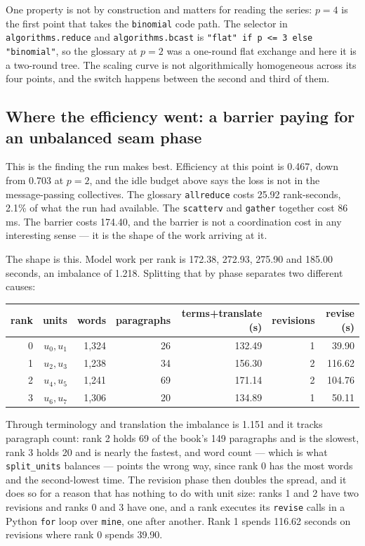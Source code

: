 \documentclass[11pt]{article}
\begin{document}
One property is not by construction and matters for reading the series: $p=4$ is the first point
that takes the \texttt{binomial} code path. The selector in \texttt{algorithms.reduce} and
\texttt{algorithms.bcast} is \texttt{"flat" if p <= 3 else "binomial"}, so the glossary at $p=2$
was a one-round flat exchange and here it is a two-round tree. The scaling curve is not
algorithmically homogeneous across its four points, and the switch happens between the second and
third of them.

\subsection*{Where the efficiency went: a barrier paying for an unbalanced seam phase}

This is the finding the run makes best. Efficiency at this point is 0.467, down from 0.703 at
$p=2$, and the idle budget above says the loss is not in the message-passing collectives. The
glossary \texttt{allreduce} costs 25.92 rank-seconds, 2.1\% of what the run had available. The
\texttt{scatterv} and \texttt{gather} together cost 86\,ms. The barrier costs 174.40, and the
barrier is not a coordination cost in any interesting sense --- it is the shape of the work
arriving at it.

The shape is this. Model work per rank is 172.38, 272.93, 275.90 and 185.00 seconds, an imbalance
of 1.218. Splitting that by phase separates two different causes:

\begin{center}
\begin{tabular}{@{}rrrrrrr@{}}
\toprule
  rank & units & words & paragraphs & terms+translate (s) & revisions & revise (s) \\
\midrule
  0 & $u_0,u_1$ & 1{,}324 & 26 & 132.49 & 1 & 39.90 \\
  1 & $u_2,u_3$ & 1{,}238 & 34 & 156.30 & 2 & 116.62 \\
  2 & $u_4,u_5$ & 1{,}241 & 69 & 171.14 & 2 & 104.76 \\
  3 & $u_6,u_7$ & 1{,}306 & 20 & 134.89 & 1 & 50.11 \\
\bottomrule
\end{tabular}
\end{center}

Through terminology and translation the imbalance is 1.151 and it tracks paragraph count: rank 2
holds 69 of the book's 149 paragraphs and is the slowest, rank 3 holds 20 and is nearly the
fastest, and word count --- which is what \texttt{split\_units} balances --- points the wrong way,
since rank 0 has the most words and the second-lowest time. The revision phase then doubles the
spread, and it does so for a reason that has nothing to do with unit size: ranks 1 and 2 have two
revisions and ranks 0 and 3 have one, and a rank executes its \texttt{revise} calls in a Python
\texttt{for} loop over \texttt{mine}, one after another. Rank 1 spends 116.62 seconds on
revisions where rank 0 spends 39.90.
\end{document}
